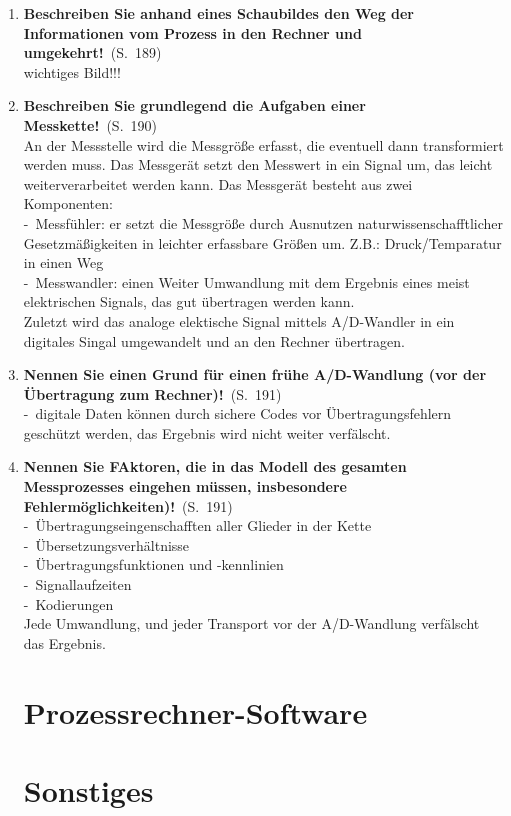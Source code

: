 \documentclass[a4paper,12pt]{article}
\newcommand{\statement}[3]{\pagebreak[3]\item {\textbf{#1!}}\ (S.\ #2)#3}
\newcommand{\catchword}[1]{\\-\ #1}
\newcommand{\normaltext}[1]{\\#1}
\newcommand{\page}[1]{#1}
\begin{document}
\begin{enumerate}
  \statement{Beschreiben Sie anhand eines Schaubildes den Weg der Informationen vom Prozess in den Rechner und umgekehrt}{\page{189}}
 {
  \normaltext{wichtiges Bild!!!}
 } 
 
 \statement{Beschreiben Sie grundlegend die Aufgaben einer Messkette}{\page{190}}
 {
  \normaltext{An der Messstelle wird die Messgröße erfasst, die eventuell dann transformiert werden muss.
  Das Messgerät setzt den Messwert in ein Signal um, das leicht weiterverarbeitet werden kann. Das Messgerät besteht aus zwei Komponenten:}
 \catchword{Messfühler: er setzt die Messgröße durch Ausnutzen naturwissenschafftlicher Gesetzmäßigkeiten in leichter erfassbare Größen um. Z.B.: Druck/Temparatur in einen Weg} 
 \catchword{Messwandler: einen Weiter Umwandlung mit dem Ergebnis eines meist elektrischen Signals, das gut übertragen werden kann.}
 \normaltext{Zuletzt wird das analoge elektische Signal mittels A/D-Wandler in ein digitales Singal umgewandelt und an den Rechner übertragen.}
 
 
 }
 
 \statement{Nennen Sie einen Grund für einen frühe A/D-Wandlung (vor der Übertragung zum Rechner)}{\page{191}} 
 {
 \catchword{digitale Daten können durch sichere Codes vor Übertragungsfehlern geschützt werden, das Ergebnis wird nicht weiter verfälscht.} 
 }
 
  \statement{Nennen Sie FAktoren, die in das Modell des gesamten Messprozesses eingehen müssen, insbesondere Fehlermöglichkeiten)}{\page{191}} 
 {
 \catchword{Übertragungseingenschafften aller Glieder in der Kette} 
 \catchword{Übersetzungsverhältnisse} 
 \catchword{Übertragungsfunktionen und -kennlinien} 
 \catchword{Signallaufzeiten} 
 \catchword{Kodierungen}
 \normaltext{Jede Umwandlung, und jeder Transport vor der A/D-Wandlung verfälscht das Ergebnis.}
 }

 
 
 
  
  
  
  
  
  
  
  


  \newpage
  \section{Prozessrechner-Software}


  \newpage
  \section{Sonstiges}


\end{enumerate}
\end{document}
